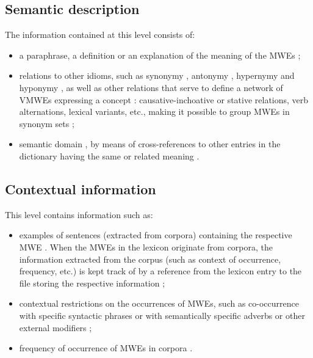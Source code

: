 \documentclass[output=paper,colorlinks,citecolor=brown]{langscibook}
\begin{document}
\subsection{Semantic description}

The information contained at this level consists of:

         \begin{itemize}\sloppy
            \item a paraphrase, a definition or an explanation of the meaning of the MWEs \citep{villavicencio-LexicalEncoding,markantonatou-etal-2019-idion,markantonatou-etal-in-prep,ECD,chapters/04,chapters/02,chapters/01};
            \item relations to other idioms, such as synonymy \citep{Autelli2020,chapters/04,chapters/02}, antonymy \citep{fellbaum2005,markantonatou-etal-2019-idion,markantonatou-etal-in-prep,chapters/02}, hypernymy and hyponymy \citep{fellbaum2005}, as well as other relations that serve to define a network of VMWEs expressing a concept \citep{markantonatou-etal-2019-idion,markantonatou-etal-in-prep}: causative-inchoative or stative relations, verb alternations, lexical variants, etc., making it possible to group MWEs in synonym sets \citep{markantonatou-etal-2019-idion,markantonatou-etal-in-prep,chapters/02};
        \item semantic domain \citep{fellbaum2005,Monti2014}, by means of cross-references to other entries in the dictionary having the same or related meaning \citep{ECD}.
        \end{itemize}

\subsection{Contextual information}

This level contains information such as:
         \begin{itemize}
            \item examples of sentences (extracted from corpora) containing the respective MWE \citep{gregoire-2007,markantonatou-etal-2019-idion,markantonatou-etal-in-prep,Odijk2013,Autelli2020,chapters/04,chapters/02,chapters/01}. When the MWEs in the lexicon originate from corpora, the information extracted from the corpus (such as context of occurrence, frequency, etc.) is kept track of by a reference from the lexicon entry to the file storing the respective information \citep{gregoire-2007};
            \item contextual restrictions on the occurrences of MWEs, such as co-occurrence with specific syntactic phrases \citep{shudo_etal_2011} or with semantically specific adverbs or other external modifiers \citep{fellbaum2005}; %
            \item frequency of occurrence of MWEs in corpora \citep{Odijk2013}.
        \end{itemize}
\end{document}
